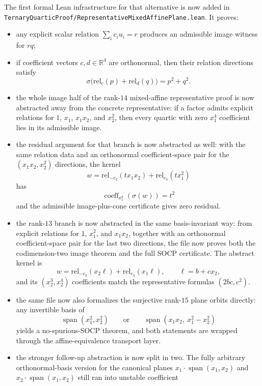 \documentclass[11pt]{article}
\begin{document}
The first formal Lean infrastructure for that alternative is now added in
\texttt{TernaryQuarticProof/RepresentativeMixedAffinePlane.lean}. It proves:
\begin{itemize}
\item any explicit scalar relation $\sum_i c_i u_i=r$ produces an admissible
  image witness for $r q$;
\item if coefficient vectors $c,d \in \mathbb{R}^4$ are orthonormal, then
  their relation directions satisfy
  \[
    \sigma\bigl(\mathrm{rel}_c(p)+\mathrm{rel}_d(q)\bigr)=p^2+q^2.
  \]
\item the whole image half of the rank-$14$ mixed-affine representative proof
  is now abstracted away from the concrete representative: if a factor admits
  explicit relations for $1$, $x_1$, $x_1x_2$, and $x_2^2$, then every quartic
  with zero $x_1^4$ coefficient lies in its admissible image.
\item the residual argument for that branch is now abstracted as well: with the
  same relation data and an orthonormal coefficient-space pair for the
  $(x_1x_2,x_2^2)$ directions, the kernel
  \[
    w=\mathrm{rel}_{-c_2}(t x_1x_2)+\mathrm{rel}_{c_3}(t x_1^2)
  \]
  has
  \[
    \operatorname{coeff}_{x_1^4}(\sigma(w))=t^2
  \]
  and the admissible image-plus-cone certificate gives zero residual.
\item the rank-$13$ branch is now abstracted in the same basis-invariant way:
  from explicit relations for $1$, $x_1^2$, and $x_1x_2$, together with an
  orthonormal coefficient-space pair for the last two directions, the file now
  proves both the codimension-two image theorem and the full SOCP certificate.
  The abstract kernel is
  \[
    w=\mathrm{rel}_{-c_2}(x_2\ell)+\mathrm{rel}_{c_3}(x_1\ell),
    \qquad \ell=b+c x_2,
  \]
  and its $(x_2^3,x_2^4)$ coefficients match the representative formulas
  $(2bc,c^2)$.
\item the same file now also formalizes the surjective rank-$15$ plane orbits
  directly: any invertible basis of
  \[
    \operatorname{span}(x_1^2,x_2^2)
    \qquad\text{or}\qquad
    \operatorname{span}(x_1x_2,\ x_1^2-x_2^2)
  \]
  yields a no-spurious-SOCP theorem, and both statements are wrapped through
  the affine-equivalence transport layer.
\item the stronger follow-up abstraction is now split in two. The fully
  arbitrary orthonormal-basis version for the canonical planes
  $x_1 \cdot \operatorname{span}(x_1,x_2)$ and
  $x_2 \cdot \operatorname{span}(x_1,x_2)$ still ran into unstable coefficient

\end{itemize}
\end{document}
